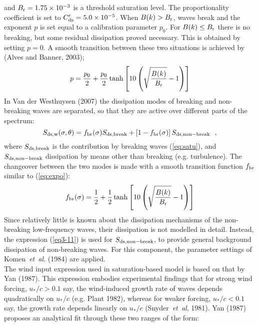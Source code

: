 \documentclass[12pt]{book}
\begin{document}
and $B_{\rm r} = 1.75 \times 10^{-3}$ is a threshold saturation level. The proportionality coefficient is set to
$C'_{\rm ds} = 5.0 \times 10^{-5}$. When $B(k) > B_{\rm r}$, waves break and the exponent $p$ is set equal
to a calibration parameter $p_0$. For $B(k) \leq B_{\rm r}$ there is no breaking, but some residual dissipation proved
necessary. This is obtained by setting $p = 0$. A smooth transition between these two situations is achieved by
(Alves and Banner, 2003);
\begin{equation}
  p = \frac{p_0}{2} + \frac{p_0}{2} \tanh \left[ 10 \left( \sqrt{\frac{B(k)}{B_{\rm r}}} - 1 \right) \right]
  \label{eq:expo}
\end{equation}
\noindent
In Van der Westhuysen (2007) the dissipation modes of breaking and non-breaking waves are separated, so that they
are active over different parts of the spectrum:
\begin{equation}
  S_{\rm ds,w}(\sigma,\theta) = f_{\rm br}(\sigma)S_{\rm ds,break} + \left[ 1 - f_{\rm br}(\sigma) \right]
  S_{\rm ds,non-break} \ \ ,
  \label{eq:wctot}
\end{equation}
\noindent
where $S_{\rm ds,break}$ is the contribution by breaking waves (\ref{eq:satu}), and $S_{\rm ds,non-break}$ dissipation
by means other than breaking (e.g. turbulence). The changeover between the two modes is made with a smooth transition
function $f_{\rm br}$ similar to (\ref{eq:expo}):
\begin{equation}
  f_{\rm br}(\sigma) = \frac{1}{2} + \frac{1}{2} \tanh \left[ 10 \left( \sqrt{\frac{B(k)}{B_{\rm r}}} - 1 \right) \right]
  \label{eq:fbr}
\end{equation}
\noindent
Since relatively little is known about the dissipation mechanisms of the non-breaking low-frequency waves, their dissipation
is not modelled in detail. Instead, the expression (\ref{eq3-11}) is used for $S_{\rm ds,non-break}$, to provide general
background dissipation of non-breaking waves. For this component, the parameter settings of Komen~{\it et~al}. (1984)
are applied.
\\[2ex]
\noindent
The wind input expression used in saturation-based model is based on that by Yan (1987). This expression embodies experimental
findings that for strong wind forcing, $u_*/c > 0.1$ say, the wind-induced growth rate of waves depends quadratically on
$u_*/c$ (e.g. Plant 1982), whereas for weaker forcing, $u_*/c < 0.1$ say, the growth rate depends linearly on $u_*/c$
(Snyder~{\it et~al}, 1981). Yan (1987) proposes an analytical fit through these two ranges of the form:
\end{document}
